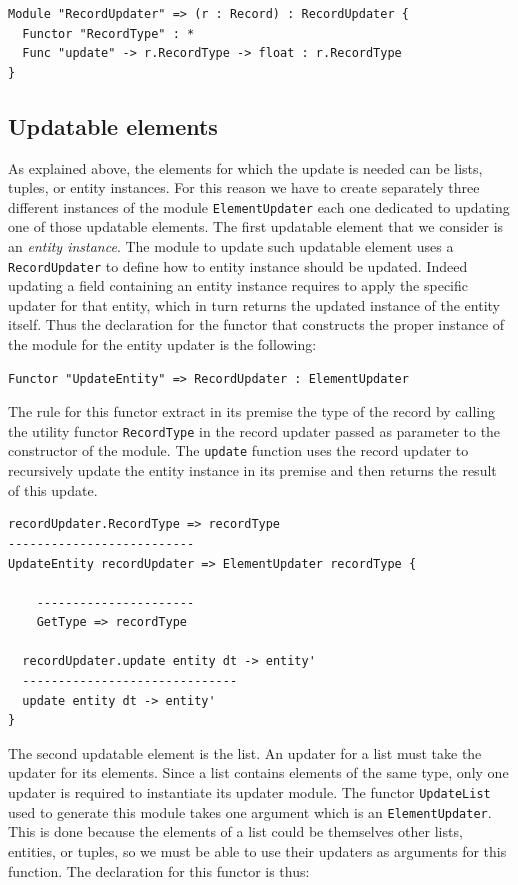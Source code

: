 \begin{lstlisting}
Module "RecordUpdater" => (r : Record) : RecordUpdater {
  Functor "RecordType" : *
  Func "update" -> r.RecordType -> float : r.RecordType
}
\end{lstlisting}

\subsection{Updatable elements}
\label{subsec:ch_networking_updatable_elements}
As explained above, the elements for which the update is needed can be lists, tuples, or entity instances. For this reason we have to create separately three different instances of the module \texttt{ElementUpdater} each one dedicated to updating one of those updatable elements. The first updatable element that we consider is an \textit{entity instance}. The module to update such updatable element uses a \texttt{RecordUpdater} to define how to entity instance should be updated. Indeed updating a field containing an entity instance requires to apply the specific updater for that entity, which in turn returns the updated instance of the entity itself. Thus the declaration for the functor that constructs the proper instance of the module for the entity updater is the following:

\begin{lstlisting}
Functor "UpdateEntity" => RecordUpdater : ElementUpdater
\end{lstlisting}

\noindent
The rule for this functor extract in its premise the type of the record by calling the utility functor \texttt{RecordType} in the record updater passed as parameter to the constructor of the module. The \texttt{update} function uses the record updater to recursively update the entity instance in its premise and then returns the result of this update.

\begin{lstlisting}
recordUpdater.RecordType => recordType
--------------------------
UpdateEntity recordUpdater => ElementUpdater recordType {

	----------------------
	GetType => recordType
 
  recordUpdater.update entity dt -> entity'
  ------------------------------
  update entity dt -> entity'
}
\end{lstlisting}

\noindent
The second updatable element is the list. An updater for a list must take the updater for its elements. Since a list contains elements of the same type, only one updater is required to instantiate its updater module. The functor \texttt{UpdateList} used to generate this module takes one argument which is an \texttt{ElementUpdater}. This is done because the elements of a list could be themselves other lists, entities, or tuples, so we must be able to use their updaters as arguments for this function. The declaration for this functor is thus:

